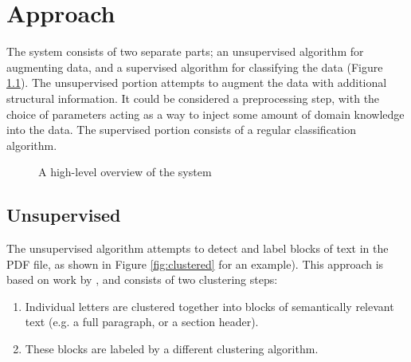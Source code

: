 \chapter{Approach}

The system consists of two separate parts; an unsupervised algorithm for
augmenting data, and a supervised algorithm for classifying the data (Figure
\ref{fig:overview}). The unsupervised portion attempts to augment the data with
additional structural information. It could be considered a preprocessing step,
with the choice of parameters acting as a way to inject some amount of domain
knowledge into the data. The supervised portion consists of a regular
classification algorithm.

\begin{figure}[htbp]
  \centering
  \caption{A high-level overview of the system}
  \label{fig:overview}
\end{figure}

\section{Unsupervised}
The unsupervised algorithm attempts to detect and label blocks of text in the
PDF file, as shown in Figure \ref{fig:clustered} for an example). This approach
is based on work by \textcite{klampfl2014unsupervised}, and consists of two
clustering steps:
\begin{enumerate}
\item Individual letters are clustered together into blocks of semantically
  relevant text (e.g. a full paragraph, or a section header).
\item These blocks are labeled by a different clustering algorithm.
\end{enumerate}


